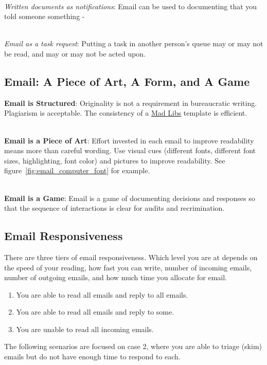 \ \\
\textit{Written documents as notifications}: Email can be used to documenting that you told someone something - 

\ \\
\textit{Email as a task request}: Putting a task in another person's queue may or may not be read, and may or may not be acted upon. 





\subsection*{Email: A Piece of Art, A Form, and A Game\label{sec:art-form-game}}


\textbf{Email is Structured}: Originality is not a requirement in bureaucratic writing. Plagiarism is acceptable. The consistency of a \href{https://en.wikipedia.org/wiki/Mad_Libs}{Mad Libs} template is efficient.  

\ \\
\textbf{Email is a Piece of Art}: Effort invested in each email to improve readability means more than careful wording. 
Use visual cues (different fonts, different font sizes, highlighting, font color) and pictures to improve readability. See figure~\ref{fig:email_computer_font} for example.

\ \\
\textbf{Email is a Game}: Email is a game of documenting decisions and responses so that the sequence of interactions is clear for audits and recrimination. 

\subsection*{Email Responsiveness\label{sec:email-responsiveness}}

There are three tiers of email responsiveness. Which level you are at depends on the speed of your reading, how fast you can write, number of incoming emails, number of outgoing emails, and how much time you allocate for email. 
\begin{enumerate}
    \item You are able to read all emails and reply to all emails.
    \item You are able to read all emails and reply to some.
    \item You are unable to read all incoming emails. 
\end{enumerate}
The following scenarios are focused on case 2, where you are able to triage (skim) emails but do not have enough time to respond to each.


